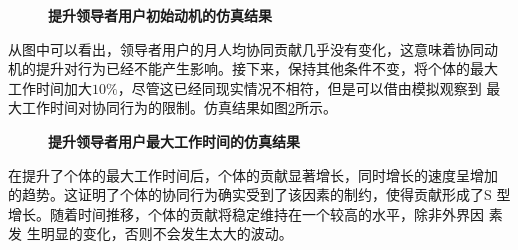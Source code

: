 \begin{figure}
  \centering
  \caption{\small{\textbf{提升领导者用户初始动机的仿真结果}}}
  \label{fig:improve1}
\end{figure}

从图中可以看出，领导者用户的月人均协同贡献几乎没有变化，这意味着协同动
机的提升对行为已经不能产生影响。接下来，保持其他条件不变，将个体的最大
工作时间加大$10\%$，尽管这已经同现实情况不相符，但是可以借由模拟观察到
最大工作时间对协同行为的限制。仿真结果如图\ref{fig:improve2}所示。

\begin{figure}
  \centering
  \caption{\small{\textbf{提升领导者用户最大工作时间的仿真结果}}}
  \label{fig:improve2}
\end{figure}

在提升了个体的最大工作时间后，个体的贡献显著增长，同时增长的速度呈增加
的趋势。这证明了个体的协同行为确实受到了该因素的制约，使得贡献形成了S
型增长。随着时间推移，个体的贡献将稳定维持在一个较高的水平，除非外界因
素发
生明显的变化，否则不会发生太大的波动。

